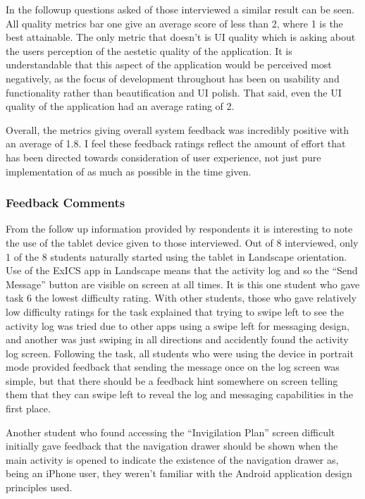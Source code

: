 In the followup questions asked of those interviewed a similar result can be seen.  All quality metrics bar one give an average score of less than 2, where 1 is the best attainable.  The only metric that doesn't is UI quality which is asking about the users perception of the aestetic quality of the application.  It is understandable that this aspect of the application would be perceived most negatively, as the focus of development throughout has been on usability and functionality rather than beautification and UI polish.  That said, even the UI quality of the application had an average rating of 2.

Overall, the metrics giving overall system feedback was incredibly positive with an average of 1.8.  I feel these feedback ratings reflect the amount of effort that has been directed towards consideration of user experience, not just pure implementation of as much as possible in the time given.

\subsubsection{Feedback Comments}

From the follow up information provided by respondents it is interesting to note the use of the tablet device given to those interviewed.  Out of 8 interviewed, only 1 of the 8 students naturally started using the tablet in Landscape orientation.  Use of the ExICS app in Landscape means that the activity log and so the ``Send Message'' button are visible on screen at all times.  It is this one student who gave task 6 the lowest difficulty rating.  With other students, those who gave relatively low difficulty ratings for the task explained that trying to swipe left to see the activity log was tried due to other apps using a swipe left for messaging design, and another was just swiping in all directions and accidently found the activity log screen.  Following the task, all students who were using the device in portrait mode provided feedback that sending the message once on the log screen was simple, but that there should be a feedback hint somewhere on screen telling them that they can swipe left to reveal the log and messaging capabilities in the first place.

Another student who found accessing the ``Invigilation Plan'' screen difficult initially gave feedback that the navigation drawer should be shown when the main activity is opened to indicate the existence of the navigation drawer as, being an iPhone user, they weren't familiar with the Android application design principles used.

